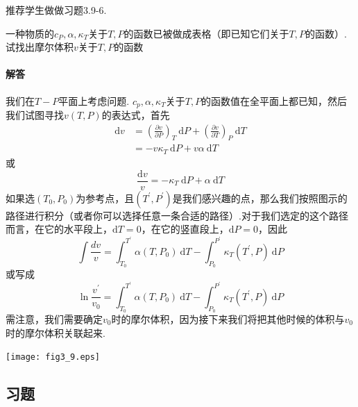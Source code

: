 推荐学生做做习题3.9-6.
\begin{example}
一种物质的$c_P,\alpha,\kappa_T$关于$T,P$的函数已被做成表格（即已知它们关于$T,P$的函数）.试找出摩尔体积$v$关于$T,P$的函数

\paragraph{解答} 我们在$T-P$平面上考虑问题. $c_p,\alpha ,\kappa_T$关于$T,P$的函数值在全平面上都已知，然后我们试图寻找$v(T,P)$的表达式，首先
\begin{align*}
\text{d}v&=\left(\frac{\partial v}{\partial P}\right)_T\ \text{d}P+\left(\frac{\partial v}{\partial T}\right)_P\ \text{d}T\\
&=-v\kappa_T\ \text{d}P+v\alpha\ \text{d}T
\end{align*}
    或
\[\frac{\text{d}v}{v}=-\kappa_T\ \text{d}P+\alpha\ \text{d}T\]
如果选$(T_0,P_0)$为参考点，且$(T^\prime,P^\prime)$是我们感兴趣的点，那么我们按照图示的路径进行积分（或者你可以选择任意一条合适的路径）.对于我们选定的这个路径而言，在它的水平段上，$\text{d}T=0$，在它的竖直段上，$\text{d}P=0$，因此
\[\int\frac{dv}{v}=\int_{T_0}^{T^\prime}\alpha(T,P_0)\ \text{d}T-\int_{P_0}^{P^\prime}\kappa_T(T^\prime,P)\ \text{d}P\]
    或写成
\[\ln{\frac{v^\prime}{v_0}}=\int_{T_0}^{T^\prime}\alpha(T,P_0)\ \text{d}T-\int_{P_0}^{P^\prime}\kappa_T(T^\prime,P)\ \text{d}P\]
需注意，我们需要确定$v_0$时的摩尔体积，因为接下来我们将把其他时候的体积与$v_0$时的摩尔体积关联起来.

{
    \centering
    \texttt{[image: fig3\_9.eps]}
}
\end{example}

\subsection*{习题}
